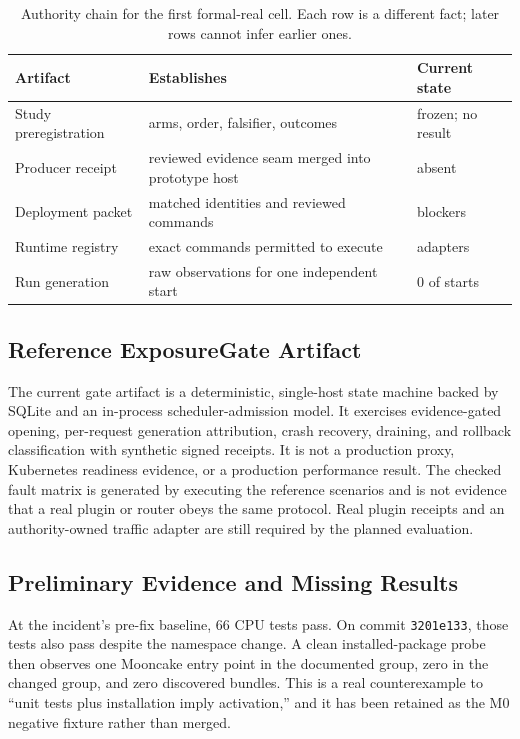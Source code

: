 \documentclass[letterpaper,twocolumn,10pt]{article}
\newcommand{\code}[1]{\texttt{#1}}
\begin{document}
\begin{table}[t]
\centering
\small
\caption{Authority chain for the first formal-real cell.  Each row is a
different fact; later rows cannot infer earlier ones.}
\begin{tabularx}{\columnwidth}{@{}lXX@{}}
\toprule
Artifact & Establishes & Current state \\
\midrule
Study preregistration & arms, order, falsifier, outcomes & frozen; no result \\
Producer receipt & reviewed evidence seam merged into prototype host & absent \\
Deployment packet & matched identities and reviewed commands &
\ECPADeploymentBlockers{} blockers \\
Runtime registry & exact commands permitted to execute &
\ECPAVerifiedAdapters{} adapters \\
Run generation & raw observations for one independent start & 0 of
\ECPAFirstStudyStarts{} starts \\
\bottomrule
\end{tabularx}
\end{table}

\subsection{Reference ExposureGate Artifact}
The current gate artifact is a deterministic, single-host state machine backed
by SQLite and an in-process scheduler-admission model.  It exercises
evidence-gated opening, per-request generation attribution, crash recovery,
draining, and rollback classification with synthetic signed receipts.  It is
not a production proxy, Kubernetes readiness evidence, or a production
performance result.  The checked fault matrix is generated by executing the
reference scenarios and is not evidence that a real plugin or router obeys the
same protocol.  Real plugin receipts and an authority-owned traffic adapter are
still required by the planned evaluation.

\subsection{Preliminary Evidence and Missing Results}
At the incident's pre-fix baseline, 66 CPU tests pass.  On commit
\code{3201e133}, those tests also pass despite the namespace change.  A clean
installed-package probe then observes one Mooncake entry point in the documented
group, zero in the changed group, and zero discovered bundles.  This is a real
counterexample to ``unit tests plus installation imply activation,'' and it has
been retained as the M0 negative fixture rather than merged.
\end{document}
